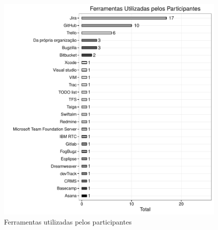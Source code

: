 \begin{figure}[htpb]
	\centering
	\includegraphics[width=0.8\linewidth]{./chapter-pesquisa-com-profissionais/img/grafico_melhorias_fgrm_ferramentas_utilizadas.pdf}
	\caption{Ferramentas utilizadas pelos participantes}
\label{fig:grafico_melhorias_fgrm_ferramentas_utilizadas}
\end{figure}

